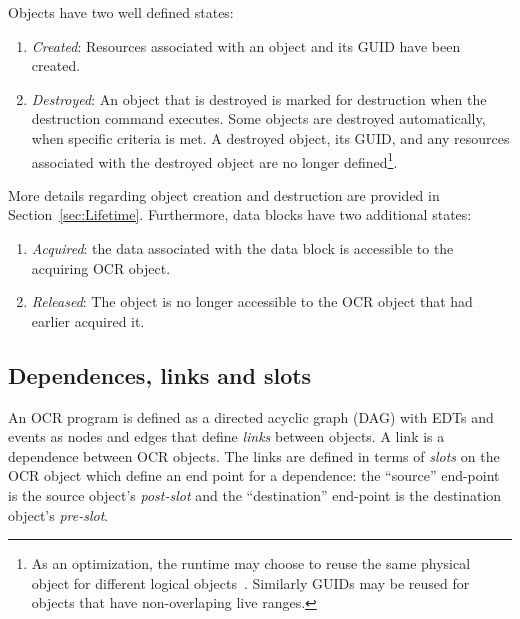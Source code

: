 Objects have two well defined states:
\begin{enumerate}
\item \emph{Created}: Resources associated with an object and its GUID
have been created.
\item \emph{Destroyed}: An object that is destroyed is marked for
destruction when the destruction command executes. Some objects
are destroyed automatically, when specific criteria is met. A destroyed object, its GUID,
and any resources associated with the destroyed object are no longer
defined\footnote{As
an optimization, the runtime may choose to reuse the same physical
object for different logical objects~\cite{USBCSS12,SbKS12}. Similarly
GUIDs may be reused for objects that have non-overlaping live ranges.}.
\end{enumerate}
More details regarding object creation and destruction are provided
in Section~\ref{sec:Lifetime}.
Furthermore, data blocks have two additional states:
\begin{enumerate}
\item \emph{Acquired}: the data associated with the data block is
accessible to the acquiring OCR object.
\item \emph{Released}: The object is no longer accessible to the OCR
object that had earlier acquired it.
\end{enumerate}


\subsection{Dependences, links and slots}
\label{sec:OCRlinks}

An OCR program is defined as a directed acyclic graph (DAG)
with EDTs and events as nodes and edges that define
\emph{links} between objects. A link is a dependence
between OCR objects. The links are defined in terms of
\emph{slots} on the OCR object which define an end
point for a dependence: the ``source'' end-point is the source object's
\emph{post-slot} and the ``destination'' end-point is the destination
object's \emph{pre-slot}.

